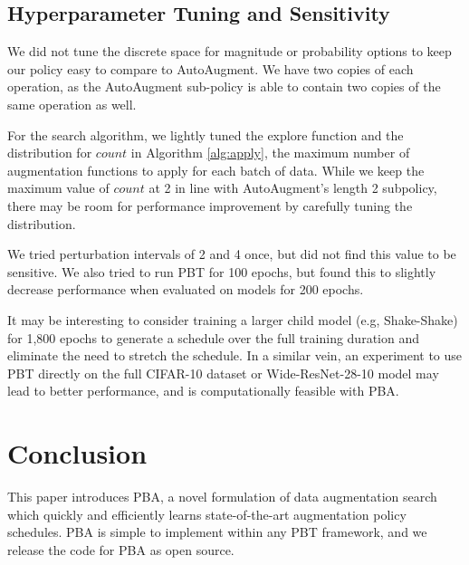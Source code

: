 \documentclass{article}
\begin{document}
\subsection{Hyperparameter Tuning and Sensitivity}
\label{tuning}
We did not tune the discrete space for magnitude or probability options to keep our policy easy to compare to AutoAugment. We have two copies of each operation, as the AutoAugment sub-policy is able to contain two copies of the same operation as well.

For the search algorithm, we lightly tuned the explore function and the distribution for $count$ in Algorithm \ref{alg:apply}, the maximum number of augmentation functions to apply for each batch of data. While we keep the maximum value of $count$ at 2 in line with AutoAugment's length 2 subpolicy, there may be room for performance improvement by carefully tuning the distribution.

We tried perturbation intervals of 2 and 4 once, but did not find this value to be sensitive. We also tried to run PBT for 100 epochs, but found this to slightly decrease performance when evaluated on models for 200 epochs. 

It may be interesting to consider training a larger child model (e.g, Shake-Shake) for 1,800 epochs to generate a schedule over the full training duration and eliminate the need to stretch the schedule. In a similar vein, an experiment to use PBT directly on the full CIFAR-10 dataset or Wide-ResNet-28-10 model may lead to better performance, and is computationally feasible with PBA.

\section{Conclusion}

This paper introduces PBA, a novel formulation of data augmentation search which quickly and efficiently learns state-of-the-art augmentation policy schedules. PBA is simple to implement within any PBT framework, and we release the code for PBA as open source.
\end{document}
